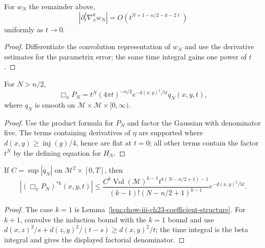 \begin{example}
\label{ex:chow-iii-ch23-expansion-derivatives}
For $w_N$ the remainder above,
\[
|\partial_t^\ell\nabla_x^kw_N|=O(t^{N+1-n/2-k-2\ell})
\]
uniformly as $t\to0$.
\end{example}
\begin{proof}
\sketch Differentiate the convolution representation of $w_N$ and use the derivative
estimates for the parametrix error; the same time integral gains one power of
$t$.
\end{proof}

\begin{lemma}
\label{lem:chow-iii-ch23-coefficient-structure}
For $N>n/2$,
\[
\Box_xP_N=t^N(4\pi t)^{-n/2}e^{-d(x,y)^2/5t}q_N(x,y,t),
\]
where $q_N$ is smooth on $\mathcal M\times\mathcal M\times[0,\infty)$.
\end{lemma}
\begin{proof}
\sketch Use the product formula for $P_N$ and factor the Gaussian with denominator five.
The terms containing derivatives of $\eta$ are supported where
$d(x,y)\ge\operatorname{inj}(g)/4$, hence are flat at $t=0$; all other terms
contain the factor $t^N$ by the defining equation for $H_N$.
\end{proof}

\begin{lemma}
\label{lem:chow-iii-ch23-convolution-estimates}
If $C=\sup|q_N|$ on $\mathcal M^2\times[0,T]$, then
\[
|(\Box_xP_N)^{*k}(x,y,t)|\le
\frac{C^k\operatorname{Vol}(\mathcal M)^{k-1}t^{k(N-n/2+1)-1}}
 {(k-1)!(N-n/2+1)^{k-1}}e^{-d(x,y)^2/5t}.
\]
\end{lemma}
\begin{proof}
\sketch The case $k=1$ is Lemma~\ref{lem:chow-iii-ch23-coefficient-structure}.  For
$k+1$, convolve the induction bound with the $k=1$ bound and use
\(d(x,z)^2/s+d(z,y)^2/(t-s)\ge d(x,y)^2/t\); the time integral is the beta
integral and gives the displayed factorial denominator.
\end{proof}

